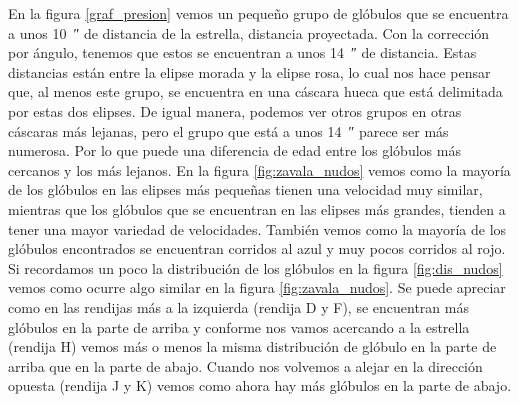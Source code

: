 \documentclass{book}
\begin{document}
En la figura \ref{graf_presion} vemos un pequeño grupo de glóbulos que se encuentra a unos \SI{10}{\arcsecond} de distancia de la estrella, distancia proyectada. Con la corrección por ángulo, tenemos que estos se encuentran a unos \SI{14}{\arcsecond} de distancia. Estas distancias están entre la elipse morada y la elipse rosa, lo cual nos hace pensar que, al menos este grupo, se encuentra en una cáscara hueca que está delimitada por estas dos elipses. De igual manera, podemos ver otros grupos en otras cáscaras más lejanas, pero el grupo que está a unos \SI{14}{\arcsecond} parece ser más numerosa. Por lo que puede una diferencia de edad entre los glóbulos más cercanos y los más lejanos. En la figura \ref{fig:zavala_nudos} vemos como la mayoría de los glóbulos en las elipses más pequeñas tienen una velocidad muy similar, mientras que los glóbulos que se encuentran en las elipses más grandes, tienden a tener una mayor variedad de velocidades. También vemos como la mayoría de los glóbulos encontrados se encuentran corridos al azul y muy pocos corridos al rojo. Si recordamos un poco la distribución de los glóbulos en la figura \ref{fig:dis_nudos} vemos como ocurre algo similar en la figura \ref{fig:zavala_nudos}. Se puede apreciar como en las rendijas más a la izquierda (rendija D y F), se encuentran más glóbulos en la parte de arriba y conforme nos vamos acercando a la estrella (rendija H) vemos más o menos la misma distribución de glóbulo en la parte de arriba que en la parte de abajo. Cuando nos volvemos a alejar en la dirección opuesta (rendija J y K) vemos como ahora hay más glóbulos en la parte de abajo.\\
\end{document}
